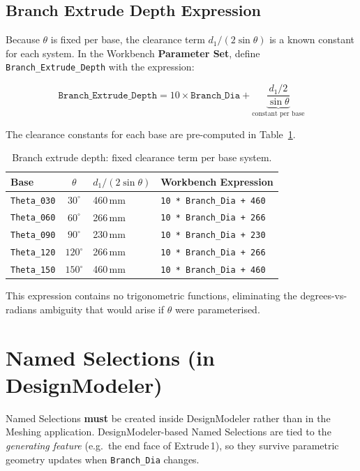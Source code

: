 \documentclass[12pt,a4paper]{report}
\begin{document}
\subsection{Branch Extrude Depth Expression}

Because $\theta$ is fixed per base, the clearance term
$d_1/(2\sin\theta)$ is a known constant for each system.  In the
Workbench \textbf{Parameter Set}, define
\texttt{Branch\_Extrude\_Depth} with the expression:

\begin{equation}
  \texttt{Branch\_Extrude\_Depth}
  = 10 \times \texttt{Branch\_Dia}
  + \underbrace{\frac{d_1 / 2}{\sin\theta}}_{\text{constant per base}}
  \label{eq:branchdepth}
\end{equation}

The clearance constants for each base are pre-computed in
Table~\ref{tab:branchdepth}.

\begin{table}[H]
\centering
\caption{Branch extrude depth: fixed clearance term per base system.}
\label{tab:branchdepth}
\begin{tabular}{@{}lcll@{}}
\toprule
\textbf{Base} & $\theta$ & $d_1/(2\sin\theta)$ &
\textbf{Workbench Expression} \\
\midrule
\texttt{Theta\_030} & $30^\circ$  & 460\,mm &
\texttt{10 * Branch\_Dia + 460} \\
\texttt{Theta\_060} & $60^\circ$  & 266\,mm &
\texttt{10 * Branch\_Dia + 266} \\
\texttt{Theta\_090} & $90^\circ$  & 230\,mm &
\texttt{10 * Branch\_Dia + 230} \\
\texttt{Theta\_120} & $120^\circ$ & 266\,mm &
\texttt{10 * Branch\_Dia + 266} \\
\texttt{Theta\_150} & $150^\circ$ & 460\,mm &
\texttt{10 * Branch\_Dia + 460} \\
\bottomrule
\end{tabular}
\end{table}

\noindent This expression contains no trigonometric functions, eliminating
the degrees-vs-radians ambiguity that would arise if $\theta$ were
parameterised.


\section{Named Selections (in DesignModeler)}
\label{sec:namedsel}

Named Selections \textbf{must} be created inside DesignModeler rather than
in the Meshing application.  DesignModeler-based Named Selections are tied
to the \emph{generating feature} (e.g.\ the end face of Extrude\,1), so
they survive parametric geometry updates when \texttt{Branch\_Dia} changes.
\end{document}
